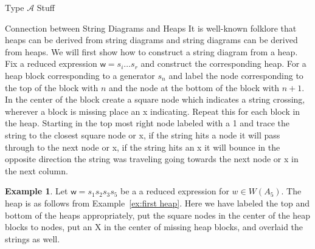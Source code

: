 \documentclass[11pt]{amsart}
\theoremstyle{definition}
\newtheorem{example}[theorem]{Example}
\numberwithin{equation}{section}
\newcommand{\A}{\mathcal{A}}
\renewcommand{\(}{\left(}
\renewcommand{\)}{\right)}
\newcommand{\w}{\mathsf{w}}
\newcommand\xxaxis{0}
\newcommand\yyaxis{90}
\newcommand\nsq[3]{\fill[fill=cyan!30, draw=black, rounded corners, line width=1pt, shift={(\xxaxis:#1)},shift={(\yyaxis:#2)}] (0,0) -- (2,0) -- (2,-2) -- (0,-2) --cycle;\node at (#1+1,#2-1) {$#3$};}
\begin{document}
\begin{section}{Type $\A$ Stuff}
\begin{subsection}{Connection between String Diagrams and Heaps}
It is well-known folklore that heaps can be derived from string diagrams and string diagrams can be derived from heaps. We will first show how to construct a string diagram from a heap. Fix a reduced expression $\w=s_i\ldots s_r$ and construct the corresponding heap. For a heap block corresponding to a generator $s_n$ and label the node corresponding to the top of the block with $n$ and the node at the bottom of the block with $n+1$. In the center of the block create a square node which indicates a string crossing, wherever a block is missing place an x indicating. Repeat this for each block in the heap. Starting in the top most right node labeled with a 1 and trace the string to the closest square node or x, if the string hits a node it will pass through to the next node or x, if the string hits an x it will bounce in the opposite direction the string was traveling going towards the next node or x in the next column.
\begin{example}\label{ex:string to heap}
Let $\w=s_1 s_2 s_3 s_5$ be a a reduced expression for $w \in W(A_5)$. The heap is as follows from Example~\ref{ex:first heap}. Here we have labeled the top and bottom of the heaps appropriately, put the square nodes in the center of the heap blocks to nodes, put an X in the center of missing heap blocks, and overlaid the strings as well. 
\begin{center} 
\end{center}
\end{example}
\end{subsection}
\end{section}
\end{document}
